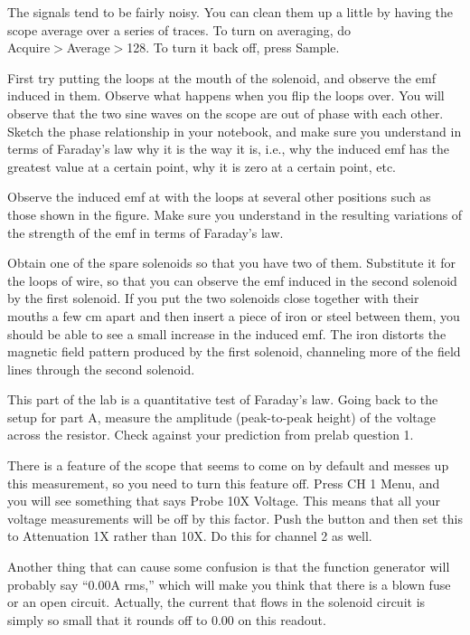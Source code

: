 The signals tend to be fairly noisy. You can clean them up
a little by having the scope average over a series of traces.
To turn on averaging, do\\
 Acquire$>$Average$>$128. To turn it back
off, press Sample.

First try putting the loops at the mouth of the solenoid,
and observe the emf induced in them. Observe what happens
when you flip the loops over. You will observe that the two
sine waves on the scope are out of phase with each other.
Sketch the phase relationship in your notebook, and make
sure you understand in terms of Faraday's law why it is the
way it is, i.e., why the induced emf has the greatest value
at a certain point, why it is zero at a certain point, etc.

Observe the induced emf at with the loops at several other
positions such as those shown in the figure. Make sure you
understand in the resulting variations of the strength of
the emf in terms of Faraday's law.


Obtain one of the spare solenoids so that you have two of
them. Substitute it for the loops of wire, so that you can
observe the emf induced in the second solenoid by the first
solenoid. If you put the two solenoids close together with
their mouths a few cm apart and then insert a piece of iron
or steel between them, you should be able to see a small
increase in the induced emf. The iron distorts the magnetic
field pattern produced by the first solenoid, channeling
more of the field lines through the second solenoid.


This part of the lab is a quantitative test of Faraday's
law. Going back to the setup for part A, measure the
amplitude (peak-to-peak height) of the voltage across the
resistor. Check against your prediction from prelab question 1.

There is a feature of the scope that seems to come on by
default and messes up this measurement, so you need to turn this
feature off. Press CH 1 Menu, and you will see something that
says Probe 10X Voltage. This means that all your voltage measurements
will be off by this factor. Push the button and then set this to
Attenuation 1X rather than 10X. Do this for channel 2 as well.

Another thing that can cause some confusion is that the function generator
will probably say ``0.00A rms,'' which will make you think that there is
a blown fuse or an open circuit. Actually, the current that flows in the
solenoid circuit is simply so small that it rounds off to 0.00 on this
readout.


